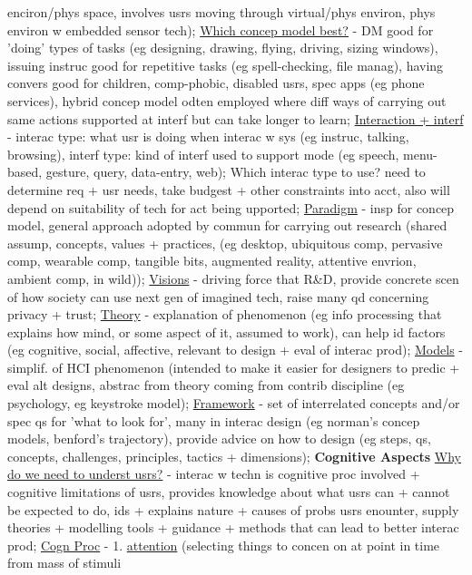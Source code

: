 \documentclass[a4paper]{article}
\begin{document}
\begin{multicols}{3}
        enciron/phys space, involves usrs moving through virtual/phys environ, phys environ w embedded sensor tech); \underline{Which concep model best?} - DM good for 'doing' types of tasks (eg designing, drawing, flying, driving,
        sizing windows), issuing instruc good for repetitive tasks (eg spell-checking, file manag), having convers good for children, comp-phobic, disabled usrs, spec apps (eg phone services), hybrid concep model odten employed
        where diff ways of carrying out same actions supported at interf but can take longer to learn; \underline{Interaction + interf} - interac type: what usr is doing when interac w sys (eg instruc,
        talking, browsing), interf type: kind of interf used to support mode (eg speech, menu-based, gesture, query, data-entry, web); Which interac type to use? need to determine req + usr needs, take budgest + other
        constraints into acct, also will depend on suitability of tech for act being upported; \underline{Paradigm} - insp for concep model, general approach adopted by commun for carrying out research (shared assump,
        concepts, values + practices, (eg desktop, ubiquitous comp, pervasive comp, wearable comp, tangible bits, augmented reality, attentive envrion, ambient comp, in wild)); \underline{Visions} - driving force that R\&D,
        provide concrete scen of how society can use next gen of imagined tech, raise many qd concerning privacy + trust; \underline{Theory} - explanation of phenomenon (eg info processing that explains how mind, or some aspect
        of it, assumed to work), can help id factors (eg cognitive, social, affective, relevant to design + eval of interac prod); \underline{Models} - simplif. of HCI phenomenon (intended to make it easier for designers to
        predic + eval alt designs, abstrac from theory coming from contrib discipline (eg psychology, eg keystroke model); \underline{Framework} - set of interrelated concepts and/or spec qs for 'what to look for', many in
        interac design (eg norman's concep models, benford's trajectory), provide advice on how to design (eg steps, qs, concepts, challenges, principles, tactics + dimensions); \newline \textbf{Cognitive Aspects} \newline
        \underline{Why do we need to underst usrs?} - interac w techn is cognitive proc involved + cognitive limitations of usrs, provides knowledge about what usrs can + cannot be expected to do, ids + explains nature + causes of
        probs usrs enounter, supply theories + modelling tools + guidance + methods that can lead to better interac prod; \underline{Cogn Proc} - 1. \underline{attention} (selecting things to concen on at point in time from mass of stimuli

\end{multicols}
\end{document}
